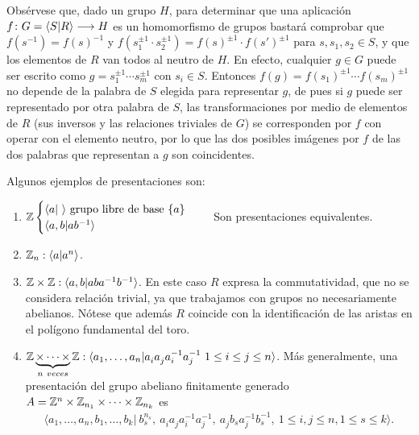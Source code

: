 \documentclass[GTS.tex]{subfiles}
\begin{document}
\begin{nota}[Importante] Obsérvese que, dado un grupo $H$, para determinar que una aplicación $f\colon{G=\langle S|R\rangle}\longrightarrow{H}$ es un homomorfismo de grupos bastará comprobar que $f(s^{-1})=f(s)^{-1}$ y $f(s_1^{\pm 1}\cdot s_2^{\pm 1})=f(s)^{\pm 1}\cdot f(s')^{\pm 1}$ para $s,s_1,s_2\in S$, y que los elementos de $R$ van todos al neutro de $H$. En efecto, cualquier $g\in G$ puede ser escrito como $g=s_1^{\pm 1}\cdots s_m^{\pm 1}$ con $s_i\in S$. Entonces $f(g)=f(s_1)^{\pm 1}\cdots f(s_m)^{\pm 1}$ no depende de la palabra de $S$ elegida para representar $g$, de pues si $g$ puede ser representado por otra palabra de $S$, las transformaciones por medio de elementos de $R$ (sus inversos y las relaciones triviales de $G$) se corresponden por $f$ con operar con el elemento neutro, por lo que las dos posibles imágenes por $f$ de las dos palabras que representan a $g$ son coincidentes.
\end{nota}

\begin{ej} Algunos ejemplos de presentaciones son:
\begin{enumerate}
\item $\mathbb{Z}\begin{cases}
\langle a|\ \rangle  \text{ grupo libre de base }\{a\}\\
\langle a,b|ab^{-1}\rangle
\end{cases}\quad$ Son presentaciones equivalentes.
\item $\mathbb{Z}_n: \langle a| a^n\rangle$.
\item $\mathbb{Z}\times\mathbb{Z}: \langle a,b| aba^{-1}b^{-1}\rangle$. En este caso $R$ expresa la commutatividad, que no se considera relación trivial, ya que trabajamos con grupos no necesariamente abelianos. Nótese que además $R$ coincide con la identificación de las aristas en el polígono fundamental del toro.
\item $\Z\underbrace{\times\cdots\times}_{n\ veces}\Z: \langle a_1,\dots,a_n|a^{}_i a^{}_j a^{-1}_i a^{-1}_j\ 1\leq i\leq j\leq n\rangle$. Más generalmente, una presentación del grupo abeliano finitamente generado  $A=\mathbb{Z}^n\times\mathbb{Z}_{n_1}\times\cdots\times\mathbb{Z}_{n_k}$ es 
\begin{gather*}
\langle a_1,\dots,a_n,b_1,\dots,b_k|\ b^{n_s}_s,\ a^{}_ia^{}_ja^{-1}_ia^{-1}_j,\ a^{}_j b^{}_s a^{-1}_j b^{-1}_s,\ 1\leq i,j\leq n, 1\leq s\leq k\rangle.
\end{gather*}
\end{enumerate}
\end{ej}
\end{document}
